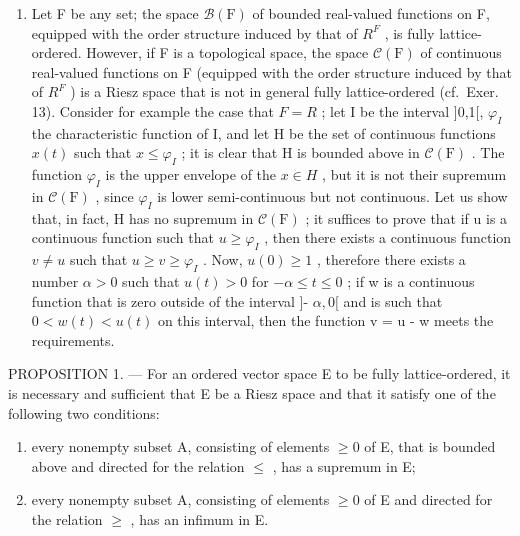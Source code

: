 \begin{enumerate}
\def\labelenumi{\arabic{enumi})}
\setcounter{enumi}{1}
\tightlist
\item
  Let F be any set; the space \(\mathcal{B}(\mathrm{F})\) of bounded real-valued functions on F, equipped with the order structure induced by that of \(R^{F}\) , is fully lattice-ordered. However, if F is a topological space, the space \(\mathcal{C}(\mathrm{F})\) of continuous real-valued functions on F (equipped with the order structure induced by that of \(R^{F}\) ) is a Riesz space that is not in general fully lattice-ordered (cf.~Exer. 13). Consider for example the case that \(F = R\) ; let I be the interval {]}0,1{[}, \(\varphi_{I}\) the characteristic function of I, and let H be the set of continuous functions \(x(t)\) such that \(x \leqslant \varphi_{I}\) ; it is clear that H is bounded above in \(\mathcal{C}(\mathrm{F})\) . The function \(\varphi_{I}\) is the upper envelope of the \(x \in H\) , but it is not their supremum in \(\mathcal{C}(\mathrm{F})\) , since \(\varphi_{I}\) is lower semi-continuous but not continuous. Let us show that, in fact, H has no supremum in \(\mathcal{C}(\mathrm{F})\) ; it suffices to prove that if u is a continuous function such that \(u \geqslant \varphi_{I}\) , then there exists a continuous function \(v \neq u\) such that \(u \geqslant v \geqslant \varphi_{I}\) . Now, \(u(0) \geqslant 1\) , therefore there exists a number \(\alpha > 0\) such that \(u(t) > 0\) for \(-\alpha \leqslant t \leqslant 0\) ; if w is a continuous function that is zero outside of the interval {]}- \(\alpha,0[\) and is such that \(0 < w(t) < u(t)\) on this interval, then the function v = u - w meets the requirements.
\end{enumerate}

PROPOSITION 1. --- For an ordered vector space E to be fully lattice-ordered, it is necessary and sufficient that E be a Riesz space and that it satisfy one of the following two conditions:

\begin{enumerate}
\def\labelenumi{\alph{enumi})}
\item
  every nonempty subset A, consisting of elements \(\geqslant0\) of E, that is bounded above and directed for the relation \(\leqslant\) , has a supremum in E;
\item
  every nonempty subset A, consisting of elements \(\geqslant 0\) of E and directed for the relation \(\geqslant\) , has an infimum in E.
\end{enumerate}


